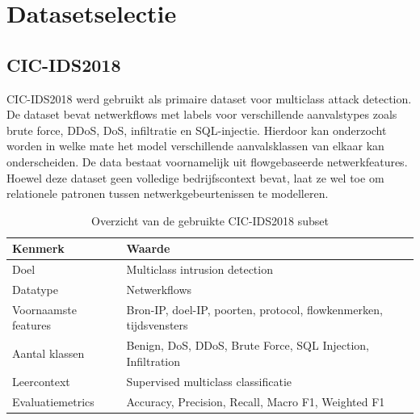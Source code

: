 \section{Datasetselectie}

\subsection{CIC-IDS2018}

CIC-IDS2018 werd gebruikt als primaire dataset voor multiclass attack detection.
\newline
\newline
De dataset bevat netwerkflows met labels voor verschillende aanvalstypes zoals brute force, DDoS, DoS, infiltratie en SQL-injectie. Hierdoor kan onderzocht worden in welke mate het model verschillende aanvalsklassen van elkaar kan onderscheiden.
\newline
\newline
De data bestaat voornamelijk uit flowgebaseerde netwerkfeatures. Hoewel deze dataset geen volledige bedrijfscontext bevat, laat ze wel toe om relationele patronen tussen netwerkgebeurtenissen te modelleren.

\begin{table}[H]
    \centering
    \caption{Overzicht van de gebruikte CIC-IDS2018 subset}
    \label{tab:cic_dataset}
    
    \begin{tabular}{p{4cm}p{7cm}}
        \toprule
        Kenmerk & Waarde \\
        \midrule
        
        Doel & Multiclass intrusion detection \\
        
        Datatype & Netwerkflows \\
        
        Voornaamste features &
        Bron-IP, doel-IP, poorten, protocol, flowkenmerken, tijdsvensters \\
        
        Aantal klassen &
        Benign, DoS, DDoS, Brute Force, SQL Injection, Infiltration \\
        
        Leercontext &
        Supervised multiclass classificatie \\
        
        Evaluatiemetrics &
        Accuracy, Precision, Recall, Macro F1, Weighted F1 \\
        
        \bottomrule
    \end{tabular}
    
\end{table}

